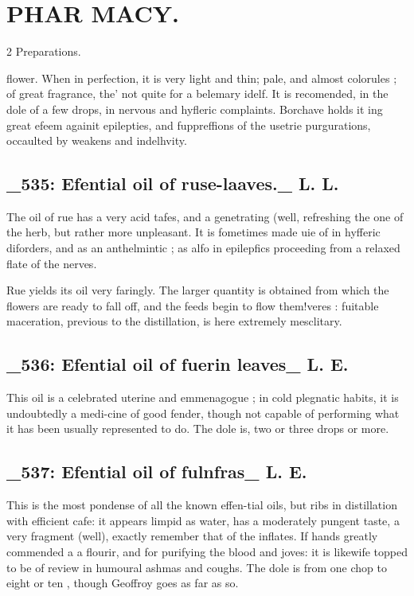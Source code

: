 \documentclass[10pt]{article}
\begin{document}
\section*{\centering \textbf{PHAR MACY.}}
\begin{multicols}{2}\raggedcolumns
Preparations.

flower. When in perfection, it is very light and thin; pale, and almost colorules ; of great fragrance, the’ not quite for a belemary idelf. It is recomended, in the dole of a few drops, in nervous and hyfleric complaints. Borchave holds it ing great efeem againit epilepties, and fuppreffions of the usetrie purgurations, occaulted by weakens and indelhvity.

\subsection*{\_535: Efential oil of ruse-laaves.\_ L. L.}
The oil of rue has a very acid tafes, and a genetrating (well, refreshing the one of the herb, but rather more unpleasant. It is fometimes made uie of in hyfferic diforders, and as an anthelmintic ; as alfo in epilepfics proceeding from a relaxed flate of the nerves.

Rue yields its oil very faringly. The larger quantity is obtained from which the flowers are ready to fall off, and the feeds begin to flow them!veres : fuitable maceration, previous to the distillation, is here extremely mesclitary.

\subsection*{\_536: Efential oil of fuerin leaves\_ L. E.}
This oil is a celebrated uterine and emmenagogue ; in cold plegnatic habits, it is undoubtedly a medi-cine of good fender, though not capable of performing what it has been usually represented to do. The dole is, two or three drops or more.

\subsection*{\_537: Efential oil of fulnfras\_ L. E.}
This is the most pondense of all the known effen-tial oils, but ribs in distillation with efficient cafe: it appears limpid as water, has a moderately pungent taste, a very fragment (well), exactly remember that of the inflates. If hands greatly commended a a flourir, and for purifying the blood and joves: it is likewife topped to be of review in humoural ashmas and coughs. The dole is from one chop to eight or ten , though Geoffroy goes as far as so.


\end{multicols}
\end{document}
